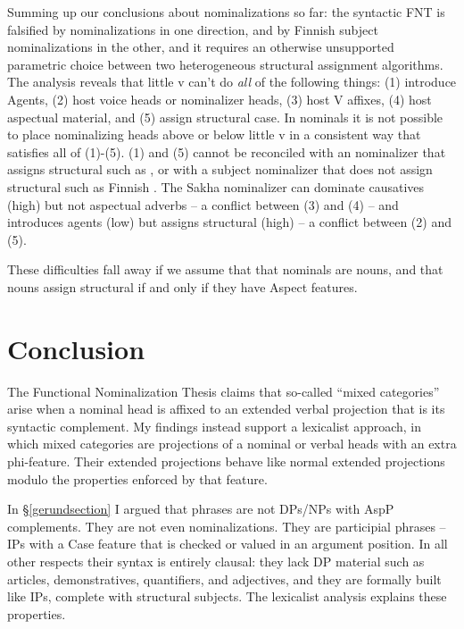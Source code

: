 \documentclass[output=paper,
modfonts
]{LSP/langsci}
\def\urf#1{$^{\textrm{\scriptsize{#1}}}$}
\begin{document}
Summing up our conclusions about  nominalizations so far:  the syntactic FNT is falsified
by   nominalizations in one direction, and by Finnish subject nominalizations in the
other, and it requires an otherwise unsupported parametric choice between two heterogeneous
structural  assignment algorithms.  The analysis reveals that little v can't do
\textit{all} of the following things: (1) introduce Agents, (2) host voice heads or 
nominalizer heads, (3) host  V affixes, (4) host aspectual material, and (5) assign
structural case.  In  nominals it is not possible to place nominalizing heads above or
below little v in a consistent way that satisfies all of (1)-(5).  (1) and (5) cannot be
reconciled with an  nominalizer that assigns structural  such as 
\form{′-tar-\urf{V}}, or with a subject nominalizer that does not assign structural  such
as Finnish .  The Sakha nominalizer  can dominate causatives (high)
but not aspectual adverbs – a conflict between (3) and (4) – and introduces agents (low) but
assigns structural  (high) – a conflict between (2) and (5).

These difficulties fall away if we assume that that  nominals are nouns, and that nouns assign
structural  if and only if they have Aspect features. 


\section{Conclusion}

The Functional Nominalization Thesis claims that so-called ``mixed categories'' arise when a nominal head is affixed to an extended verbal projection that is its syntactic complement.
My findings instead support a lexicalist approach, in which mixed categories are projections of
a nominal or verbal heads with an extra phi-feature.  Their extended projections behave like
normal extended projections modulo the properties enforced by that feature.

In \S\ref{gerundsection} I argued that  phrases are not DPs/NPs with AspP complements.
They are not even nominalizations.  They are participial phrases – IPs with a Case feature that
is checked or valued in an argument position.  In all other respects their syntax is entirely clausal:
they lack DP material such as articles, demonstratives, quantifiers, and adjectives, and they
are formally built like IPs, complete with structural subjects.  The lexicalist analysis explains 
these properties.
\end{document}
